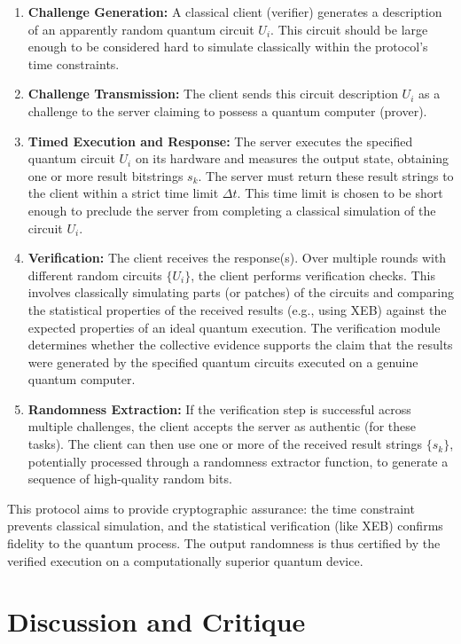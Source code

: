 \documentclass[11pt, a4paper]{article}
\begin{document}
\begin{enumerate}
    \item \textbf{Challenge Generation:} A classical client (verifier) generates a description of an apparently random quantum circuit $U_i$. This circuit should be large enough to be considered hard to simulate classically within the protocol's time constraints.
    \item \textbf{Challenge Transmission:} The client sends this circuit description $U_i$ as a challenge to the server claiming to possess a quantum computer (prover).
    \item \textbf{Timed Execution and Response:} The server executes the specified quantum circuit $U_i$ on its hardware and measures the output state, obtaining one or more result bitstrings $s_k$. The server must return these result strings to the client within a strict time limit $\Delta t$. This time limit is chosen to be short enough to preclude the server from completing a classical simulation of the circuit $U_i$.
    \item \textbf{Verification:} The client receives the response(s). Over multiple rounds with different random circuits $\{U_i\}$, the client performs verification checks. This involves classically simulating parts (or patches) of the circuits and comparing the statistical properties of the received results (e.g., using XEB) against the expected properties of an ideal quantum execution. The verification module determines whether the collective evidence supports the claim that the results were generated by the specified quantum circuits executed on a genuine quantum computer.
    \item \textbf{Randomness Extraction:} If the verification step is successful across multiple challenges, the client accepts the server as authentic (for these tasks). The client can then use one or more of the received result strings $\{s_k\}$, potentially processed through a randomness extractor function, to generate a sequence of high-quality random bits.
\end{enumerate}

This protocol aims to provide cryptographic assurance: the time constraint prevents classical simulation, and the statistical verification (like XEB) confirms fidelity to the quantum process. The output randomness is thus certified by the verified execution on a computationally superior quantum device.

\section{Discussion and Critique}
\end{document}
